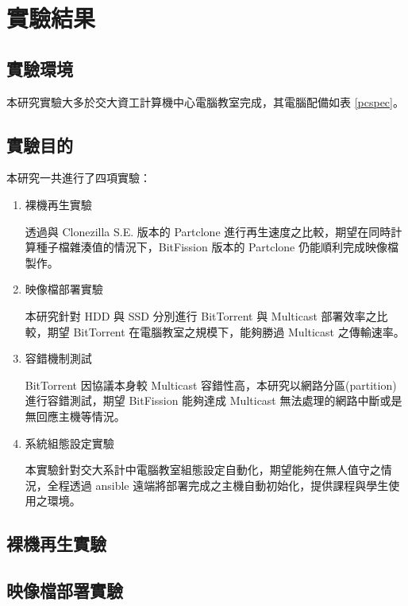 \chapter{實驗結果}
\label{c:experiment}
\section{實驗環境}
本研究實驗大多於交大資工計算機中心電腦教室完成，其電腦配備如表 \ref{pcspec}。

\section{實驗目的}
本研究一共進行了四項實驗：
\begin{enumerate}
\item{裸機再生實驗}

透過與 Clonezilla S.E. 版本的 Partclone 進行再生速度之比較，期望在同時計算種子檔雜湊值的情況下，BitFission 版本的 Partclone 仍能順利完成映像檔製作。

\item{映像檔部署實驗}

本研究針對 HDD 與 SSD 分別進行 BitTorrent 與 Multicast 部署效率之比較，期望 BitTorrent 在電腦教室之規模下，能夠勝過 Multicast 之傳輸速率。

\item{容錯機制測試}

BitTorrent 因協議本身較 Multicast 容錯性高，本研究以網路分區(partition)進行容錯測試，期望 BitFission 能夠達成 Multicast 無法處理的網路中斷或是無回應主機等情況。

\item{系統組態設定實驗}

本實驗針對交大系計中電腦教室組態設定自動化，期望能夠在無人值守之情況，全程透過 ansible 遠端將部署完成之主機自動初始化，提供課程與學生使用之環境。

\end{enumerate}
\section{裸機再生實驗}


\section{映像檔部署實驗}



